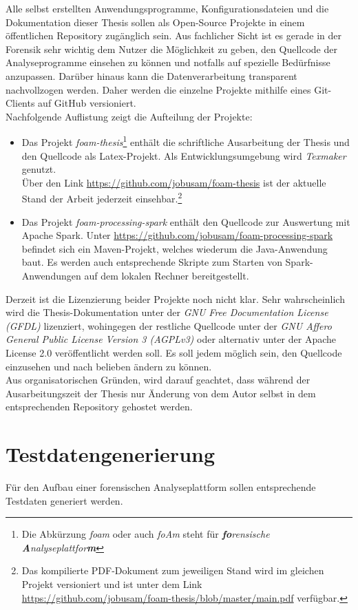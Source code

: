 \noindent
Alle selbst erstellten Anwendungsprogramme, Konfigurationsdateien und die Dokumentation dieser Thesis sollen als Open-Source Projekte in einem öffentlichen Repository zugänglich sein. Aus fachlicher Sicht ist es gerade in der Forensik sehr wichtig dem Nutzer die Möglichkeit zu geben, den Quellcode der Analyseprogramme einsehen zu können und notfalls auf spezielle Bedürfnisse anzupassen. Darüber hinaus kann die Datenverarbeitung transparent nachvollzogen werden.
Daher werden die einzelne Projekte mithilfe eines Git-Clients auf GitHub versioniert.\\
Nachfolgende Auflistung zeigt die Aufteilung der Projekte:
\begin{itemize}
\item Das Projekt \textit{foam-thesis}\footnote{Die Abkürzung \textit{foam} oder auch \textit{foAm} steht für \textit{\textbf{fo}rensische \textbf{A}nalyseplattfor\textbf{m}}} enthält die schriftliche Ausarbeitung der Thesis und den Quellcode als Latex-Projekt. Als Entwicklungsumgebung wird \textit{Texmaker} genutzt.\\
Über den Link \url{https://github.com/jobusam/foam-thesis} ist der aktuelle Stand der Arbeit jederzeit einsehbar.\footnote{Das kompilierte PDF-Dokument zum jeweiligen Stand wird im gleichen Projekt versioniert und ist unter dem Link \url{https://github.com/jobusam/foam-thesis/blob/master/main.pdf} verfügbar.}

\item Das Projekt \textit{foam-processing-spark} enthält den Quellcode zur Auswertung mit Apache Spark\texttrademark\thinspace. Unter \url{https://github.com/jobusam/foam-processing-spark} befindet sich ein Maven-Projekt, welches wiederum die Java-Anwendung baut. Es werden auch entsprechende Skripte zum Starten von Spark-Anwendungen auf dem lokalen Rechner bereitgestellt. 
\end{itemize}

\noindent
Derzeit ist die Lizenzierung beider Projekte noch nicht klar. Sehr wahrscheinlich wird die Thesis-Dokumentation unter der \textit{GNU Free Documentation License (GFDL)} lizenziert, wohingegen der restliche Quellcode unter der \textit{GNU Affero General Public License Version 3 (AGPLv3)} oder alternativ unter der Apache License 2.0 veröffentlicht werden soll. Es soll jedem möglich sein, den Quellcode einzusehen und nach belieben ändern zu können.\\

\noindent
Aus organisatorischen Gründen, wird darauf geachtet, dass während der Ausarbeitungszeit der Thesis nur Änderung von dem Autor selbst in dem entsprechenden Repository gehostet werden.\\

\section{Testdatengenerierung}
\label{testdatacreation}
Für den Aufbau einer forensischen Analyseplattform sollen entsprechende Testdaten generiert werden. \\